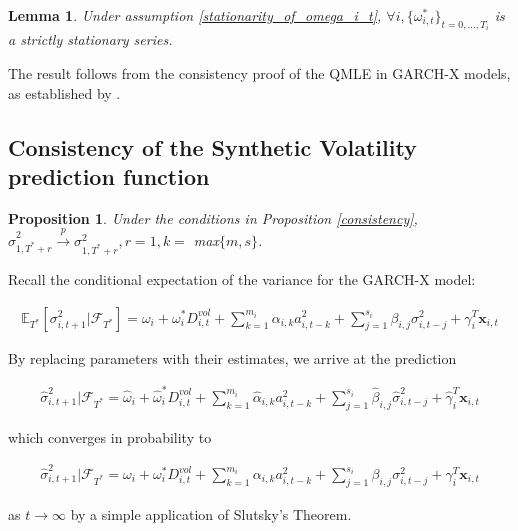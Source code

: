 \documentclass[11pt]{article}
\newcommand{\x}{\textbf{x}}
\def\E{\mathbb{E}} %
\newtheorem{lem}{Lemma}
\newtheorem{prop}{Proposition}
\theoremstyle{definition}
\newenvironment{proof-of-proposition}[1][{}]{\noindent{\bf
    Proof of Proposition {#1}}
  \hspace*{.5em}}{\qed\bigskip\\}
\begin{document}
\begin{lem}
  Under assumption \ref{stationarity_of_omega_i_t}, $\forall i, \{\omega_{i,t}^{*}\}_{t=0,...,T_i}$ is a strictly stationary series.
\end{lem}

\begin{proof-of-proposition}
The result follows from the consistency proof of the QMLE in GARCH-X models, as established by \citet{han2014asymptotic}.
\end{proof-of-proposition}

  \subsection{Consistency of the Synthetic Volatility prediction function}
\begin{prop}
  Under the conditions in Proposition \ref{consistency}, $\hat\sigma^{2}_{1,T^{*}+r}\xrightarrow{p}\sigma^{2}_{1,T^{*}+r}, r = 1, k =$ max$\{m,s\}$.
\end{prop}

\begin{proof-of-proposition}
Recall the conditional expectation of the variance for the GARCH-X model:

\begin{align}
\E_{T^{*}}[\sigma^{2}_{i,t+1}|\mathcal{F}_{T^{*}}] = \omega_{i} + \omega^{*}_i D^{vol}_{i,t} + \sum^{m_{i}}_{k=1}\alpha_{i,k}a^{2}_{i,t-k} + \sum_{j=1}^{s_{i}}\beta_{i,j}\sigma_{i,t-j}^{2} + \gamma_{i}^{T} \x_{i,t}
\end{align}

By replacing parameters with their estimates, we arrive at the prediction 

\begin{align}
\hat\sigma^{2}_{i,t+1}|\mathcal{F}_{T^{*}} = \hat\omega_{i} + \hat\omega^{*}_i D^{vol}_{i,t} + \sum^{m_{i}}_{k=1}\hat\alpha_{i,k}a^{2}_{i,t-k} + \sum_{j=1}^{s_{i}}\hat\beta_{i,j}\hat\sigma_{i,t-j}^{2} + \hat\gamma_{i}^{T} \x_{i,t}
\end{align}

which converges in probability to 

\begin{align}
  \hat\sigma^{2}_{i,t+1}|\mathcal{F}_{T^{*}} = \omega_{i} + \omega^{*}_i D^{vol}_{i,t} + \sum^{m_{i}}_{k=1}\alpha_{i,k}a^{2}_{i,t-k} + \sum_{j=1}^{s_{i}}\beta_{i,j}\sigma_{i,t-j}^{2} + \gamma_{i}^{T} \x_{i,t}
  \end{align}

as $t\rightarrow\infty$ by a simple application of Slutsky's Theorem.

\end{proof-of-proposition}
\end{document}

